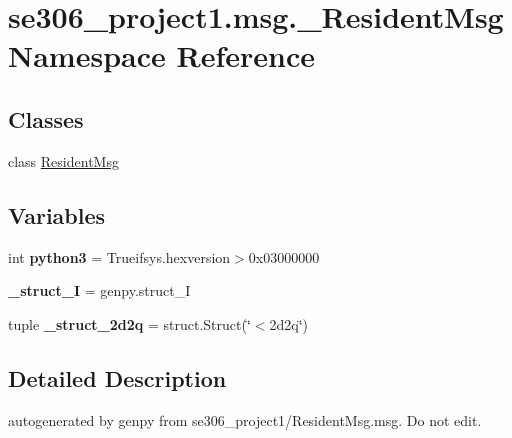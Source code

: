 \hypertarget{namespacese306__project1_1_1msg_1_1__ResidentMsg}{\section{se306\-\_\-project1.\-msg.\-\_\-\-Resident\-Msg Namespace Reference}
\label{namespacese306__project1_1_1msg_1_1__ResidentMsg}
}
\subsection*{Classes}
\begin{DoxyCompactItemize}
\item 
class \hyperlink{classse306__project1_1_1msg_1_1__ResidentMsg_1_1ResidentMsg}{Resident\-Msg}
\end{DoxyCompactItemize}
\subsection*{Variables}
\begin{DoxyCompactItemize}
\item 
\hypertarget{namespacese306__project1_1_1msg_1_1__ResidentMsg_a255c6c3500d1399ba4341772b9b0ef6f}{int {\bfseries python3} = Trueifsys.\-hexversion$>$0x03000000}\label{namespacese306__project1_1_1msg_1_1__ResidentMsg_a255c6c3500d1399ba4341772b9b0ef6f}

\item 
\hypertarget{namespacese306__project1_1_1msg_1_1__ResidentMsg_a4565578fb609fa4999233eae7394f260}{{\bfseries \-\_\-struct\-\_\-\-I} = genpy.\-struct\-\_\-\-I}\label{namespacese306__project1_1_1msg_1_1__ResidentMsg_a4565578fb609fa4999233eae7394f260}

\item 
\hypertarget{namespacese306__project1_1_1msg_1_1__ResidentMsg_a8e7f4dd83108176e2229ab71749c8a54}{tuple {\bfseries \-\_\-struct\-\_\-2d2q} = struct.\-Struct(\char`\"{}$<$2d2q\char`\"{})}\label{namespacese306__project1_1_1msg_1_1__ResidentMsg_a8e7f4dd83108176e2229ab71749c8a54}

\end{DoxyCompactItemize}


\subsection{Detailed Description}
\begin{DoxyVerb}autogenerated by genpy from se306_project1/ResidentMsg.msg. Do not edit.\end{DoxyVerb}
 